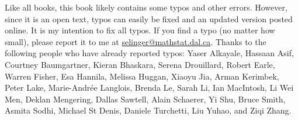 Like all books, this book likely contains some typos and other
errors. However, since it is an open text, typos can easily be fixed
and an updated version posted online. It is my intention to fix all
typos. If you find a typo (no matter how small), please report it to
me at
\href{mailto:selinger@mathstat.dal.ca}{selinger@mathstat.dal.ca}. Thanks
to the following people who have already reported typos: Yaser
Alkayale, Hassaan Asif, Courtney Baumgartner, Kieran Bhaskara, Serena
Drouillard, Robert Earle, Warren Fisher, Esa Hannila, Melissa Huggan,
Xiaoyu Jia, Arman Kerimbek, Peter Lake, Marie-Andr\'ee Langlois,
Brenda Le, Sarah Li, Ian MacIntosh, Li Wei Men, Deklan Mengering,
Dallas Sawtell, Alain Schaerer, Yi Shu, Bruce Smith, Asmita Sodhi,
Michael St Denis, Daniele Turchetti, Liu Yuhao, and Ziqi Zhang.
